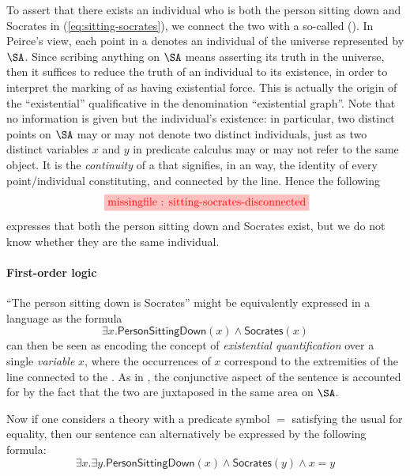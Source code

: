 \begin{scope}
\begin{scope}
\AP To assert that there exists an individual who is both the person sitting
down and Socrates in  (\ref{eq:sitting-socrates}), we connect the two
 with a so-called  (). In
Peirce's view, each point in a  denotes an individual of the universe
represented by $\SA$. Since scribing anything on $\SA$ means asserting its truth
in the universe, then it suffices to reduce the truth of an individual to its
existence, in order to interpret the marking of  as having existential
force. This is actually the origin of the ``existential'' qualificative in the
denomination ``existential graph''. Note that no information is given but the
individual's existence: in particular, two distinct points on $\SA$ may or may
not denote two distinct individuals, just as two distinct variables $x$ and $y$
in predicate calculus may or may not refer to the same object. It is the
\emph{continuity} of a  that signifies, in an  way, the
identity of every point/individual constituting, and connected by the line.
Hence the following
$$\tikzfig{1}{0.5}{sitting-socrates-disconnected}$$ expresses that both the
person sitting down and Socrates exist, but we do not know whether they are the
same individual.

\paragraph{First-order logic} ``The person sitting down is Socrates'' might be
equivalently expressed in a  language as the formula
\begin{equation}
  \exists x. \mathsf{PersonSittingDown}(x) \wedge \mathsf{Socrates}(x) \label{eq:sitting-socrates-fo}
\end{equation}
 can then be seen as encoding the concept of \emph{existential
quantification} over a single \emph{variable} $x$, where the occurrences of $x$
correspond to the extremities of the line connected to the . As in
, the conjunctive aspect of the sentence is accounted for by the fact
that the two  are juxtaposed in the same area on $\SA$.

Now if one considers a  theory with a predicate symbol $=$
satisfying the usual  for equality, then our sentence can
alternatively be expressed by the following formula:
\begin{equation}
  \exists x. \exists y. \mathsf{PersonSittingDown}(x) \wedge
  \mathsf{Socrates}(y) \wedge x = y \label{eq:sitting-socrates-fo-eq}
\end{equation}


\end{scope}
\end{scope}
